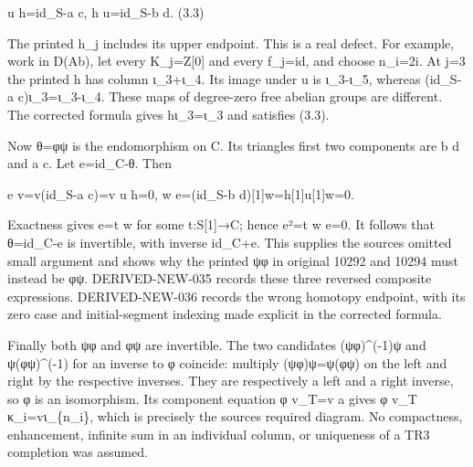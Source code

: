 \documentclass[11pt]{article}
\begin{document}
u h\allowbreak{}=id\_\allowbreak{}S-a c,\allowbreak{} h u\allowbreak{}=id\_\allowbreak{}S-b d. (3.3)\allowbreak{}

The printed h\_\allowbreak{}j includes its upper endpoint. This is a real defect. For example,\allowbreak{} work in D(Ab)\allowbreak{},\allowbreak{} let every K\_\allowbreak{}j\allowbreak{}=Z[0]\allowbreak{} and every f\_\allowbreak{}j\allowbreak{}=id,\allowbreak{} and choose n\_\allowbreak{}i\allowbreak{}=2i. At j\allowbreak{}=3 the printed h has column ι\_\allowbreak{}3\allowbreak{}+ι\_\allowbreak{}4. Its image under u is ι\_\allowbreak{}3-ι\_\allowbreak{}5,\allowbreak{} whereas (id\_\allowbreak{}S-a c)\allowbreak{}ι\_\allowbreak{}3\allowbreak{}=ι\_\allowbreak{}3-ι\_\allowbreak{}4. These maps of degree-zero free abelian groups are different. The corrected formula gives hι\_\allowbreak{}3\allowbreak{}=ι\_\allowbreak{}3 and satisfies (3.3)\allowbreak{}.

Now θ\allowbreak{}=φψ is the endomorphism on C. Its triangle\textquotesingle s first two components are b d and a c. Let e\allowbreak{}=id\_\allowbreak{}C-θ. Then

e v\allowbreak{}=v(id\_\allowbreak{}S-a c)\allowbreak{}\allowbreak{}=v u h\allowbreak{}=0,\allowbreak{} w e\allowbreak{}=(id\_\allowbreak{}S-b d)\allowbreak{}[1]\allowbreak{}w\allowbreak{}=h[1]\allowbreak{}u[1]\allowbreak{}w\allowbreak{}=0.

Exactness gives e\allowbreak{}=t w for some t:\allowbreak{}S[1]\allowbreak{}\allowbreak{}→C; hence e²\allowbreak{}=t w e\allowbreak{}=0. It follows that θ\allowbreak{}=id\_\allowbreak{}C-e is invertible,\allowbreak{} with inverse id\_\allowbreak{}C\allowbreak{}+e. This supplies the source\textquotesingle s omitted small argument and shows why the printed ψφ in original 10292 and 10294 must instead be φψ. DERIVED-NEW-035 records these three reversed composite expressions. DERIVED-NEW-036 records the wrong homotopy endpoint,\allowbreak{} with its zero case and initial-segment indexing made explicit in the corrected formula.

Finally both ψφ and φψ are invertible. The two candidates (ψφ)\allowbreak{}\textasciicircum{}(-1)\allowbreak{}ψ and ψ(φψ)\allowbreak{}\textasciicircum{}(-1)\allowbreak{} for an inverse to φ coincide:\allowbreak{} multiply (ψφ)\allowbreak{}ψ\allowbreak{}=ψ(φψ)\allowbreak{} on the left and right by the respective inverses. They are respectively a left and a right inverse,\allowbreak{} so φ is an isomorphism. Its component equation φ v\_\allowbreak{}T\allowbreak{}=v a gives φ v\_\allowbreak{}T κ\_\allowbreak{}i\allowbreak{}=vι\_\allowbreak{}\{n\_\allowbreak{}i\},\allowbreak{} which is precisely the source\textquotesingle s required diagram. No compactness,\allowbreak{} enhancement,\allowbreak{} infinite sum in an individual column,\allowbreak{} or uniqueness of a TR3 completion was assumed.
\end{document}

